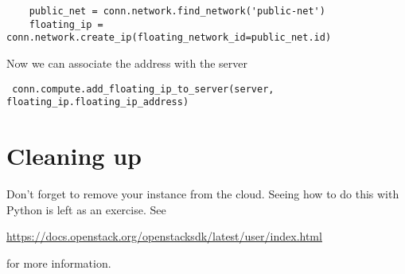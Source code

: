 \documentclass{article}
\begin{document}
\begin{verbatim}
    public_net = conn.network.find_network('public-net')
    floating_ip = conn.network.create_ip(floating_network_id=public_net.id) 
\end{verbatim}

Now we can associate the address with the server

\begin{verbatim}
 conn.compute.add_floating_ip_to_server(server, floating_ip.floating_ip_address)
\end{verbatim}

\section{Cleaning up}
Don't forget to remove your instance from the cloud. Seeing how to do this with Python is left as an exercise. See

\url{https://docs.openstack.org/openstacksdk/latest/user/index.html}

for more information.
\end{document}
